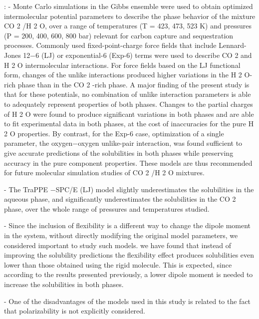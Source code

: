 \cite{Orozco2014}: - Monte Carlo simulations in the Gibbs ensemble
were used to obtain optimized intermolecular potential
parameters to describe the phase behavior of the mixture
CO 2 /H 2 O, over a range of temperatures (T = 423, 473, 523 K) and pressures  (P = 200, 400, 600, 800 bar) relevant
for carbon capture and sequestration processes. Commonly used
ﬁxed-point-charge force ﬁelds that include Lennard-Jones 12−6
(LJ) or exponential-6 (Exp-6) terms were used to describe CO 2
and H 2 O intermolecular interactions. For force ﬁelds based on
the LJ functional form, changes of the unlike interactions
produced higher variations in the H 2 O-rich phase than in the
CO 2 -rich phase. A major ﬁnding of the present study is that for
these potentials, no combination of unlike interaction
parameters is able to adequately represent properties of both
phases. Changes to the partial charges of H 2 O were found to produce signiﬁcant variations in both phases and are able to ﬁt
experimental data in both phases, at the cost of inaccuracies for the pure H 2 O properties. By contrast, for the Exp-6 case,
optimization of a single parameter, the oxygen−oxygen unlike-pair interaction, was found suﬃcient to give accurate predictions
of the solubilities in both phases while preserving accuracy in the pure component properties. These models are thus
recommended for future molecular simulation studies of CO 2 /H 2 O mixtures.

- The TraPPE −SPC/E (LJ) model slightly underestimates the solubilities in
the aqueous phase, and signiﬁcantly underestimates the
solubilities in the CO 2 phase, over the whole range of
pressures and temperatures studied. 

- Since the inclusion of ﬂexibility is a diﬀerent way to change the dipole moment in the system, without directly modifying the original model parameters, we considered important to study such models. we have found that instead of improving the solubility predictions the ﬂexibility eﬀect produces solubilities even lower than those obtained using the rigid molecule. This is expected, since according to the results presented previously, a lower dipole moment is needed to increase the solubilities in
both phases.

- One of the disadvantages of the models used in this study
is related to the fact that polarizability is not explicitly
considered.



